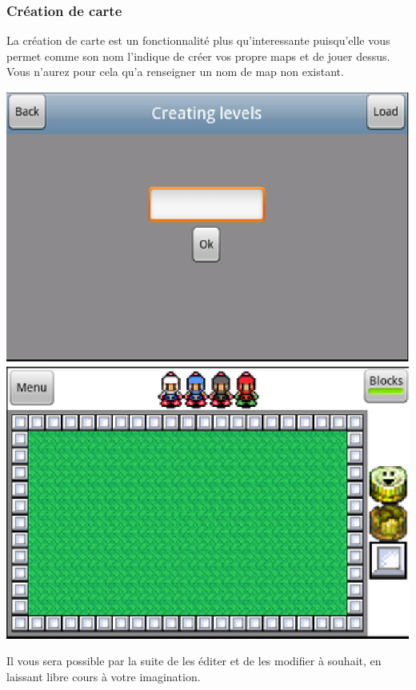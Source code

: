 	\subsubsection{Création de carte}
	La création de carte est un fonctionnalité plus qu'interessante puisqu'elle
	vous permet comme son nom l'indique de créer vos propre maps et de jouer
	dessus. Vous n'aurez pour cela qu'a renseigner un nom de map non existant. 
	\begin{center}						
			\includegraphics[scale=0.6]{Developpement/Img/10.eps}
			\includegraphics[scale=0.6]{Developpement/Img/11.eps}
		\end{center}
	Il vous sera possible par la suite de les éditer et de les modifier à souhait,
	en laissant libre cours à votre imagination.
	
	
